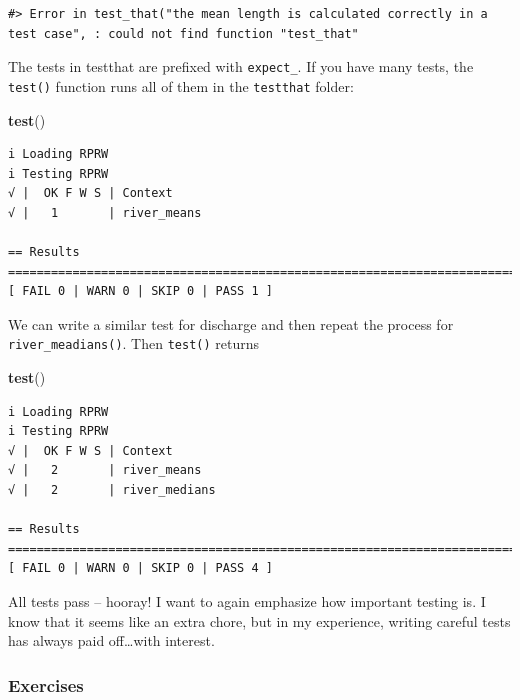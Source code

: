 \documentclass[
]{book}
\newenvironment{Shaded}{\begin{snugshade}}{\end{snugshade}}
\newcommand{\KeywordTok}[1]{\textcolor[rgb]{0.13,0.29,0.53}{\textbf{#1}}}
\newcommand{\NormalTok}[1]{#1}
\begin{document}
\begin{verbatim}
#> Error in test_that("the mean length is calculated correctly in a test case", : could not find function "test_that"
\end{verbatim}

The tests in testthat are prefixed with \texttt{expect\_}. If you have many tests, the \texttt{test()} function runs all of them in the \texttt{testthat} folder:

\begin{Shaded}
\begin{Highlighting}[]
\KeywordTok{test}\NormalTok{()}
\end{Highlighting}
\end{Shaded}

\begin{verbatim}
i Loading RPRW
i Testing RPRW
√ |  OK F W S | Context
√ |   1       | river_means                                                     
                                               
== Results =========================================================================
[ FAIL 0 | WARN 0 | SKIP 0 | PASS 1 ]
\end{verbatim}

We can write a similar test for discharge and then repeat the process for \texttt{river\_meadians()}. Then \texttt{test()} returns

\begin{Shaded}
\begin{Highlighting}[]
\KeywordTok{test}\NormalTok{()}
\end{Highlighting}
\end{Shaded}

\begin{verbatim}
i Loading RPRW
i Testing RPRW
√ |  OK F W S | Context
√ |   2       | river_means                                                         
√ |   2       | river_medians                                                       

== Results =========================================================================
[ FAIL 0 | WARN 0 | SKIP 0 | PASS 4 ]
\end{verbatim}

All tests pass -- hooray! I want to again emphasize how important testing is. I know that it seems like an extra chore, but in my experience, writing careful tests has always paid off\ldots with interest.

\hypertarget{exercises-3}{%
\subsubsection{Exercises}\label{exercises-3}}
\end{document}
